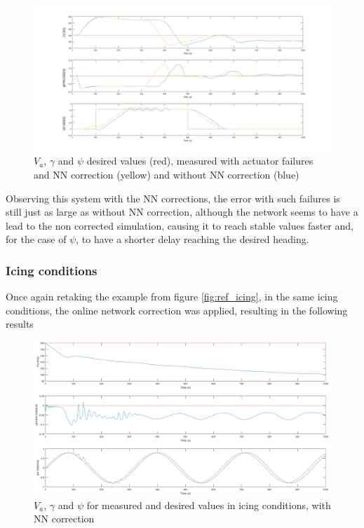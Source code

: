 \begin{figure}[H]
\centering
\includegraphics[width=1.1\textwidth]{Figures/Results/ref_act_failure_NN.png}
\caption[$V_a$, $\gamma$ and $\psi$ measured and desired values on actuation failure with NN correction]{$V_a$, $\gamma$ and $\psi$ desired  values (red), measured with actuator failures and NN correction (yellow) and without NN correction (blue)}
\label{fig:ref_act_fail_NN}
\end{figure}

Observing this system with the NN corrections, the error with such failures is still just as large as without NN correction, although the network seems to have a lead to the non corrected simulation, causing it to reach stable values faster and, for the case of $\psi$, to have a shorter delay reaching the desired heading.  

\subsubsection{Icing conditions}

Once again retaking the example from figure \ref{fig:ref_icing}, in the same icing conditions, the online network correction was applied, resulting in the following results

\begin{figure}[H]
\centering
\includegraphics[width=1.1\textwidth]{Figures/Results/ref_icing_NN.PNG}
\caption[Reference following in icing conditions with NN correction]{$V_a$, $\gamma$ and $\psi$ for measured and desired values in icing conditions, with NN correction}
\label{fig:ref_icing_NN}
\end{figure}

